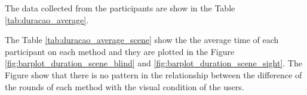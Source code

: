 
The data collected from the participants are show in the Table \ref{tab:duracao_average}.



The Table \ref{tab:duracao_average_scene} show the the average time of each participant on each method and they are plotted in the Figure \ref{fig:barplot_duration_scene_blind} and \ref{fig:barplot_duration_scene_sight}. The Figure show that there is no pattern in the relationship between the difference of the rounds of each method with the visual condition of the users. 





